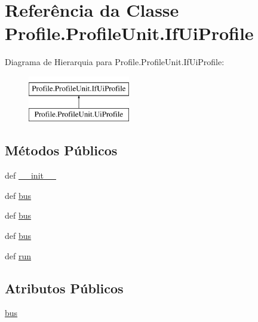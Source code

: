 \hypertarget{classProfile_1_1ProfileUnit_1_1IfUiProfile}{\section{Referência da Classe Profile.\-Profile\-Unit.\-If\-Ui\-Profile}
\label{dc/d25/classProfile_1_1ProfileUnit_1_1IfUiProfile}
}
Diagrama de Hierarquia para Profile.\-Profile\-Unit.\-If\-Ui\-Profile\-:\begin{figure}[H]
\begin{center}
\leavevmode
\includegraphics[height=2.000000cm]{dc/d25/classProfile_1_1ProfileUnit_1_1IfUiProfile}
\end{center}
\end{figure}
\subsection*{Métodos Públicos}
\begin{DoxyCompactItemize}
\item 
def \hyperlink{classProfile_1_1ProfileUnit_1_1IfUiProfile_a558fbb501ee3dbc4a16d3165479c38bc}{\-\_\-\-\_\-init\-\_\-\-\_\-}
\item 
def \hyperlink{classProfile_1_1ProfileUnit_1_1IfUiProfile_ac3d0a7a780dcf729b9f3cf1fff243a78}{bus}
\item 
def \hyperlink{classProfile_1_1ProfileUnit_1_1IfUiProfile_ac3d0a7a780dcf729b9f3cf1fff243a78}{bus}
\item 
def \hyperlink{classProfile_1_1ProfileUnit_1_1IfUiProfile_ac3d0a7a780dcf729b9f3cf1fff243a78}{bus}
\item 
def \hyperlink{classProfile_1_1ProfileUnit_1_1IfUiProfile_afb22574cb4a2dc58c068437bd7075e5a}{run}
\end{DoxyCompactItemize}
\subsection*{Atributos Públicos}
\begin{DoxyCompactItemize}
\item 
\hyperlink{classProfile_1_1ProfileUnit_1_1IfUiProfile_a32a87d193e5d14e0ff3125d6bab2c420}{bus}
\end{DoxyCompactItemize}



